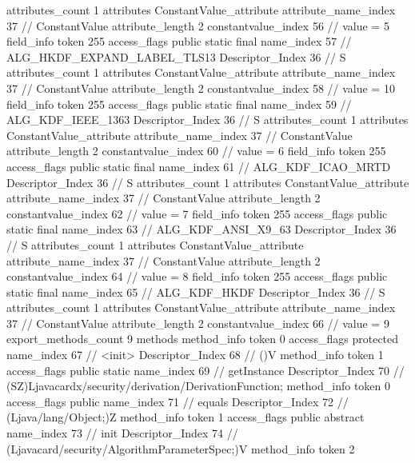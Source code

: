 {{{{{				attributes_count	1
				attributes {
				ConstantValue_attribute {
					attribute_name_index	37		// ConstantValue
					attribute_length	2
					constantvalue_index	56		// value = 5
				}
				}
			}
			field_info {
				token	255
				access_flags	public static final
				name_index	57		// ALG_HKDF_EXPAND_LABEL_TLS13
				Descriptor_Index	36		// S
				attributes_count	1
				attributes {
				ConstantValue_attribute {
					attribute_name_index	37		// ConstantValue
					attribute_length	2
					constantvalue_index	58		// value = 10
				}
				}
			}
			field_info {
				token	255
				access_flags	public static final
				name_index	59		// ALG_KDF_IEEE_1363
				Descriptor_Index	36		// S
				attributes_count	1
				attributes {
				ConstantValue_attribute {
					attribute_name_index	37		// ConstantValue
					attribute_length	2
					constantvalue_index	60		// value = 6
				}
				}
			}
			field_info {
				token	255
				access_flags	public static final
				name_index	61		// ALG_KDF_ICAO_MRTD
				Descriptor_Index	36		// S
				attributes_count	1
				attributes {
				ConstantValue_attribute {
					attribute_name_index	37		// ConstantValue
					attribute_length	2
					constantvalue_index	62		// value = 7
				}
				}
			}
			field_info {
				token	255
				access_flags	public static final
				name_index	63		// ALG_KDF_ANSI_X9_63
				Descriptor_Index	36		// S
				attributes_count	1
				attributes {
				ConstantValue_attribute {
					attribute_name_index	37		// ConstantValue
					attribute_length	2
					constantvalue_index	64		// value = 8
				}
				}
			}
			field_info {
				token	255
				access_flags	public static final
				name_index	65		// ALG_KDF_HKDF
				Descriptor_Index	36		// S
				attributes_count	1
				attributes {
				ConstantValue_attribute {
					attribute_name_index	37		// ConstantValue
					attribute_length	2
					constantvalue_index	66		// value = 9
				}
				}
			}
			}
			export_methods_count	9
			methods {
				method_info {
					token	0
					access_flags	protected
					name_index	67		// <init>
					Descriptor_Index	68		// ()V
				}
				method_info {
					token	1
					access_flags	public static
					name_index	69		// getInstance
					Descriptor_Index	70		// (SZ)Ljavacardx/security/derivation/DerivationFunction;
				}
				method_info {
					token	0
					access_flags	public
					name_index	71		// equals
					Descriptor_Index	72		// (Ljava/lang/Object;)Z
				}
				method_info {
					token	1
					access_flags	public abstract
					name_index	73		// init
					Descriptor_Index	74		// (Ljavacard/security/AlgorithmParameterSpec;)V
				}
				method_info {
					token	2
}}}}}
